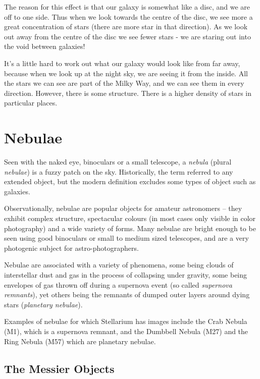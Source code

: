The reason for this effect is that our galaxy is somewhat like a disc,
and we are off to one side. Thus when we look towards the centre of the
disc, we see more a great concentration of stars (there are more star in
that direction). As we look out away from the centre of the disc we see
fewer stars - we are staring out into the void between galaxies!

It's a little hard to work out what our galaxy would look like from far
away, because when we look up at the night sky, we are seeing it from
the inside. All the stars we can see are part of the Milky Way, and we
can see them in every direction. However, there is some structure. There
is a higher density of stars in particular places.

\section{Nebulae}
\label{sec:Phenomena:Nebulae}

Seen with the naked eye, binoculars or a small telescope, a
\emph{nebula} (plural \emph{nebulae}) is a fuzzy patch on the sky.
Historically, the term referred to any extended object, but the modern
definition excludes some types of object such as galaxies.

Observationally, nebulae are popular objects for amateur astronomers
-- they exhibit complex structure, spectacular colours (in most cases
only visible in color photography) and a wide variety of forms. Many
nebulae are bright enough to be seen using good binoculars or small to
medium sized telescopes, and are a very photogenic subject for
astro-photographers.

Nebulae are associated with a variety of phenomena, some being clouds of
interstellar dust and gas in the process of collapsing under gravity,
some being envelopes of gas thrown off during a supernova event (so
called \emph{supernova remnants}), yet others being the remnants of
dumped outer layers around dying stars (\emph{planetary nebulae}).

Examples of nebulae for which Stellarium has images include the Crab
Nebula (M1), which is a supernova remnant, and the Dumbbell Nebula
(M27) and the Ring Nebula (M57) which are planetary nebulae.

\subsection{The Messier Objects}
\label{sec:Phenomena:Messier}

